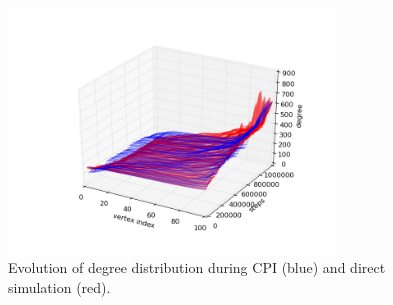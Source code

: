 \documentclass[11pt]{article}
\begin{document}
\begin{figure}
  \centering
  \includegraphics[height=65mm]{erCPI}
  \caption{Evolution of degree distribution during CPI (blue) and direct simulation (red).}
  \label{fig:erRecon}
\end{figure}
\end{document}
